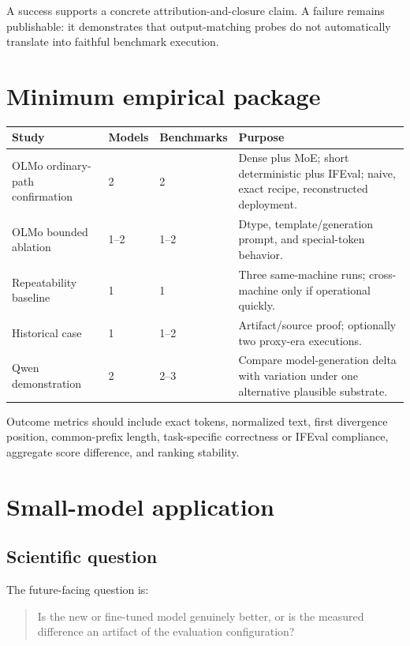 \documentclass[11pt]{article}
\begin{document}
A success supports a concrete attribution-and-closure claim. A failure remains publishable: it demonstrates that output-matching probes do not automatically translate into faithful benchmark execution.

\section{Minimum empirical package}

\begin{longtable}{@{}P{0.24\textwidth}P{0.14\textwidth}P{0.14\textwidth}P{0.39\textwidth}@{}}
\toprule
Study & Models & Benchmarks & Purpose \\
\midrule
OLMo ordinary-path confirmation & 2 & 2 & Dense plus MoE; short deterministic plus IFEval; naive, exact recipe, reconstructed deployment. \\
OLMo bounded ablation & 1--2 & 1--2 & Dtype, template/generation prompt, and special-token behavior. \\
Repeatability baseline & 1 & 1 & Three same-machine runs; cross-machine only if operational quickly. \\
Historical case & 1 & 1--2 & Artifact/source proof; optionally two proxy-era executions. \\
Qwen demonstration & 2 & 2--3 & Compare model-generation delta with variation under one alternative plausible substrate. \\
\bottomrule
\end{longtable}

Outcome metrics should include exact tokens, normalized text, first divergence position, common-prefix length, task-specific correctness or IFEval compliance, aggregate score difference, and ranking stability.

\section{Small-model application}

\subsection{Scientific question}

The future-facing question is:

\begin{quote}
Is the new or fine-tuned model genuinely better, or is the measured difference an artifact of the evaluation configuration?
\end{quote}
\end{document}
